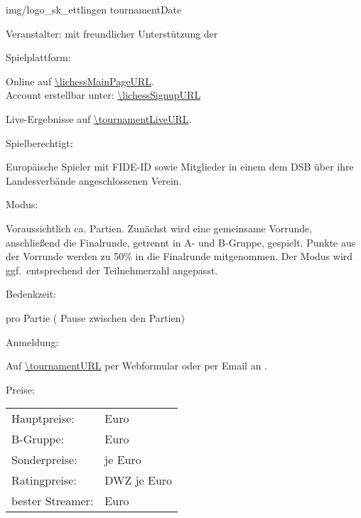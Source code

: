 \documentclass[paper=a4, fontsize=10pt]{scrartcl}
\begin{document}
                 {img/logo_sk_ettlingen}
                 {\tournamentName}
                 {tournamentDate}


\begin{basedescript}{\desclabelstyle{\multilinelabel}\desclabelwidth{10em}}
                 

\item[Veranstalter:]
  \organizerName{} mit freundlicher Unterstützung der \sponsorName{}

\item[Spielplattform:]

  Online auf \url{\lichessMainPageURL}. \\
  Account erstellbar unter: \url{\lichessSignupURL}

  Live-Ergebnisse auf \url{\tournamentLiveURL}.

\item[Spielberechtigt:]

  Europäische Spieler mit FIDE-ID sowie Mitglieder in einem dem DSB
  über ihre Landesverbände angeschlossenen Verein.

\item[Modus:]

  Voraussichtlich ca. \expectedTotalGames{} Partien. Zunächst wird
  eine gemeinsame Vorrunde, anschließend die Finalrunde, getrennt in
  A- und B-Gruppe, gespielt. Punkte aus der Vorrunde werden zu 50\% in
  die Finalrunde mitgenommen. Der Modus wird ggf.\ entsprechend der
  Teilnehmerzahl angepasst.

\item[Bedenkzeit:]

  \timePerGame{} pro Partie (\pauseBetweenGames{} Pause zwischen den
  Partien)

\item[Anmeldung:]

  Auf \url{\tournamentURL} per Webformular oder per Email an
  \email{\tournamentEmail}.

\item[Preise:]

  \hspace{2em}\begin{tabular}[t]{ll}
    Hauptpreise:       &  \is{/}{\prizesTournamentA} Euro \\
    B-Gruppe:          &  \is{/}{\prizesTournamentB} Euro \\
    Sonderpreise:      &  \is{/}{\specialPrizesCateries} je \specialPrizes{} Euro \\
    Ratingpreise:      &  DWZ \is{/}{\ratingPriceCategories} je \ratingPrices{} Euro \\
    bester Streamer:   &  \specialPrizes{} Euro
  \end{tabular}
  

\end{basedescript}
\end{document}
